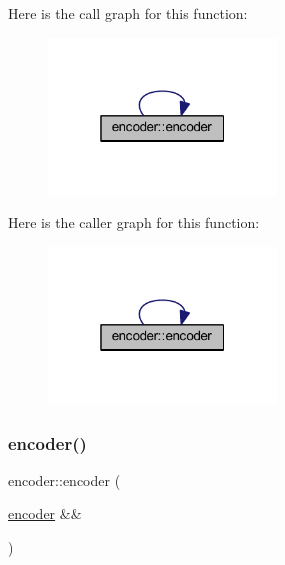 Here is the call graph for this function\+:
\nopagebreak
\begin{figure}[H]
\begin{center}
\leavevmode
\includegraphics[width=172pt]{classencoder_a074f819c70398da9ce1af632dc391a19_cgraph}
\end{center}
\end{figure}
Here is the caller graph for this function\+:
\nopagebreak
\begin{figure}[H]
\begin{center}
\leavevmode
\includegraphics[width=172pt]{classencoder_a074f819c70398da9ce1af632dc391a19_icgraph}
\end{center}
\end{figure}
\mbox{\label{classencoder_a612e51df8504a258ebab3f6cc296d0c4}} 
\subsubsection{\texorpdfstring{encoder()}{encoder()}\hspace{0.1cm}{\footnotesize\ttfamily [3/4]}}
{\footnotesize\ttfamily encoder\+::encoder (\begin{DoxyParamCaption}\item[{\mbox{\hyperlink{classencoder}{encoder}} \&\&}]{ }\end{DoxyParamCaption})\hspace{0.3cm}{\ttfamily [default]}}

\mbox{\label{classencoder_a6a9eb2f09a64535bc1105e415af90493}} 
